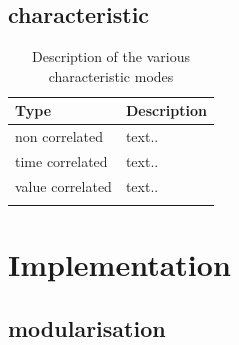 \documentclass[a4paper,11pt]{article}
\begin{document}
\subsection{characteristic}

\begin{table}[h]
    \begin{center}
        \begin{tabular}{l||l}
		Type 							& Description	\\
		\hline
		non correlated				& text..	\\
		time correlated				& text..	\\
		value correlated				& text..	\\

	\\													
        \end{tabular}
        \caption{Description of the various characteristic modes}
        \label{tab:typen}
    \end{center}
\end{table}

\section{Implementation}

\subsection{modularisation}
\end{document}
